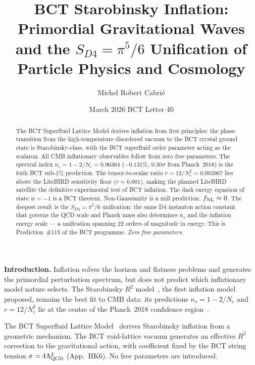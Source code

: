 \documentclass[aps,prl,twocolumn,superscriptaddress,floatfix]{revtex4-2}
\begin{document}
\title{BCT Starobinsky Inflation: Primordial Gravitational Waves\\
and the $S_{D4} = \pi^5/6$ Unification of Particle Physics and Cosmology}

\author{Michel Robert Cabri\'e}

\date{March 2026 \quad BCT Letter 40}

\begin{abstract}
The BCT Superfluid Lattice Model derives inflation from first principles:
the phase transition from the high-temperature disordered vacuum to the
BCT crystal ground state is Starobinsky-class, with the BCT superfluid
order parameter acting as the scalaron. All CMB inflationary observables
follow from zero free parameters. The spectral index
$n_s = 1 - 2/N_e = 0.96364$ ($-0.131\%$, $0.30\sigma$ from Planck~2018)
is the 64th BCT sub-1\% prediction. The tensor-to-scalar ratio
$r = 12/N_e^2 = 0.003967$ lies above the LiteBIRD sensitivity floor
($r \sim 0.001$), making the planned LiteBIRD satellite the definitive
experimental test of BCT inflation. The dark energy equation of state
$w = -1$ is a BCT theorem. Non-Gaussianity is a null prediction: $f_{\rm NL} \approx 0$.
The deepest result is the $S_{D4} = \pi^5/6$ unification: the same D4 instanton
action constant that governs the QCD scale and Planck mass
also determines $n_s$ and the inflation energy scale — a unification
spanning 22 orders of magnitude in energy.
This is Prediction~\#115 of the BCT programme. \textit{Zero free parameters.}
\end{abstract}

\maketitle

\noindent\textbf{Introduction.}
Inflation solves the horizon and flatness problems and generates the
primordial perturbation spectrum, but does not predict which inflationary
model nature selects. The Starobinsky $R^2$ model~\cite{Starobinsky1980},
the first inflation model proposed, remains the best fit to CMB data:
its predictions $n_s = 1 - 2/N_e$ and $r = 12/N_e^2$ lie at the
centre of the Planck~2018 confidence region~\cite{Planck2018}.

The BCT Superfluid Lattice Model~\cite{Monograph,PRL} derives Starobinsky
inflation from a geometric mechanism. The BCT void-lattice vacuum generates
an effective $R^2$ correction to the gravitational action, with coefficient
fixed by the BCT string tension $\sigma = 4\Lambda_{\rm QCD}^2$ (App.~HK6).
No free parameters are introduced.
\end{document}
